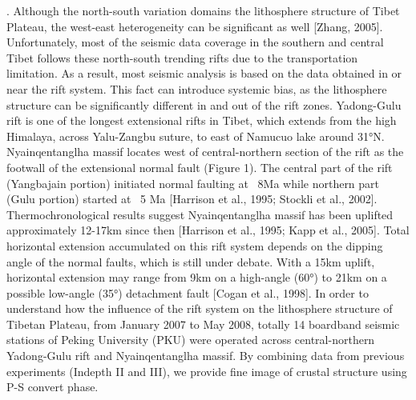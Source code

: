 . 
Although the north-south variation domains the lithosphere structure of Tibet Plateau, the west-east heterogeneity can be significant as well [Zhang, 2005]. Unfortunately, most of the seismic data coverage in the southern and central Tibet follows these north-south trending rifts due to the transportation limitation. As a result, most seismic analysis is based on the data obtained in or near the rift system. This fact can introduce systemic bias, as the lithosphere structure can be significantly different in and out of the rift zones.
Yadong-Gulu rift is one of the longest extensional rifts in Tibet, which extends from the high Himalaya, across Yalu-Zangbu suture, to east of Namucuo lake around 31°N. Nyainqentanglha massif locates west of central-northern section of the rift as the footwall of the extensional normal fault (Figure 1). The central part of the rift (Yangbajain portion) initiated normal faulting at ~8Ma while northern part (Gulu portion) started at ~5 Ma [Harrison et al., 1995; Stockli et al., 2002]. Thermochronological results suggest Nyainqentanglha massif has been uplifted approximately 12-17km since then [Harrison et al., 1995; Kapp et al., 2005]. Total horizontal extension accumulated on this rift system depends on the dipping angle of the normal faults, which is still under debate. With a 15km uplift, horizontal extension may range from 9km on a high-angle (60°) to 21km on a possible low-angle (35°) detachment fault [Cogan et al., 1998]. 
In order to understand how the influence of the rift system on the lithosphere structure of Tibetan Plateau, from January 2007 to May 2008, totally 14 boardband seismic stations of Peking University (PKU) were operated across central-northern Yadong-Gulu rift and Nyainqentanglha massif. By combining data from previous experiments (Indepth II and III), we provide fine image of crustal structure using P-S convert phase.
